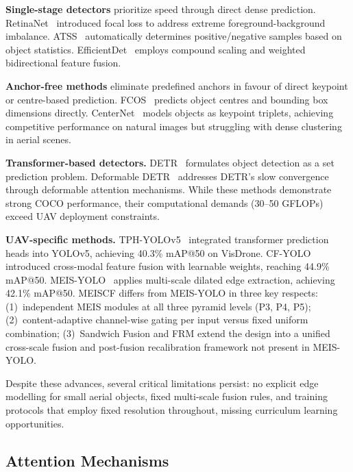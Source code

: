 \documentclass[preprint,12pt]{elsarticle}
\begin{document}
\textbf{Single-stage detectors} prioritize speed through direct dense prediction.
RetinaNet~\cite{retinanet} introduced focal loss to address extreme
foreground-background imbalance. ATSS~\cite{atss} automatically determines
positive/negative samples based on object statistics. EfficientDet~\cite{
efficientdet} employs compound scaling and weighted bidirectional feature fusion.

\textbf{Anchor-free methods} eliminate predefined anchors in favour of direct
keypoint or centre-based prediction. FCOS~\cite{fcos} predicts object centres
and bounding box dimensions directly. CenterNet~\cite{centernet} models objects
as keypoint triplets, achieving competitive performance on natural images but
struggling with dense clustering in aerial scenes.

\textbf{Transformer-based detectors.} DETR~\cite{detr} formulates object
detection as a set prediction problem. Deformable DETR~\cite{deformable-detr}
addresses DETR's slow convergence through deformable attention mechanisms. While
these methods demonstrate strong COCO performance, their computational demands
(30--50 GFLOPs) exceed UAV deployment constraints.

\textbf{UAV-specific methods.} TPH-YOLOv5~\cite{tph-yolo} integrated transformer
prediction heads into YOLOv5, achieving 40.3\% mAP@50 on VisDrone. CF-YOLO~\cite{
cf-yolo} introduced cross-modal feature fusion with learnable weights, reaching
44.9\% mAP@50. MEIS-YOLO~\cite{meis-yolo} applies multi-scale dilated edge
extraction, achieving 42.1\% mAP@50. MEISCF differs from MEIS-YOLO in three key
respects: (1)~independent MEIS modules at all three pyramid levels (P3, P4, P5);
(2)~content-adaptive channel-wise gating per input versus fixed uniform
combination; (3)~Sandwich Fusion and FRM extend the design into a unified
cross-scale fusion and post-fusion recalibration framework not present in
MEIS-YOLO.

Despite these advances, several critical limitations persist: no explicit edge
modelling for small aerial objects, fixed multi-scale fusion rules, and training
protocols that employ fixed resolution throughout, missing curriculum learning
opportunities.

\subsection{Attention Mechanisms}
\end{document}
